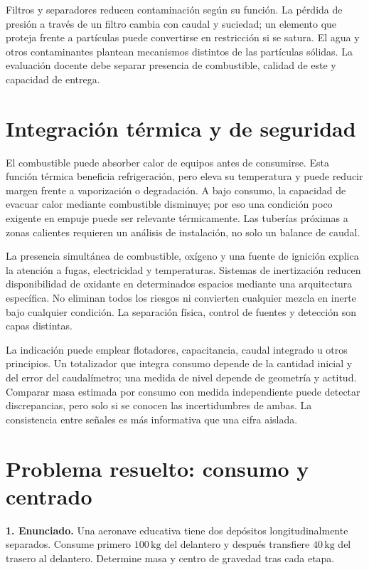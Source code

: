 Filtros y separadores reducen contaminación según su función. La pérdida de presión a través de un filtro cambia con caudal y suciedad; un elemento que proteja frente a partículas puede convertirse en restricción si se satura. El agua y otros contaminantes plantean mecanismos distintos de las partículas sólidas. La evaluación docente debe separar presencia de combustible, calidad de este y capacidad de entrega.

\section{Integración térmica y de seguridad}
El combustible puede absorber calor de equipos antes de consumirse. Esta función térmica beneficia refrigeración, pero eleva su temperatura y puede reducir margen frente a vaporización o degradación. A bajo consumo, la capacidad de evacuar calor mediante combustible disminuye; por eso una condición poco exigente en empuje puede ser relevante térmicamente. Las tuberías próximas a zonas calientes requieren un análisis de instalación, no solo un balance de caudal.

La presencia simultánea de combustible, oxígeno y una fuente de ignición explica la atención a fugas, electricidad y temperaturas. Sistemas de inertización reducen disponibilidad de oxidante en determinados espacios mediante una arquitectura específica. No eliminan todos los riesgos ni convierten cualquier mezcla en inerte bajo cualquier condición. La separación física, control de fuentes y detección son capas distintas.

La indicación puede emplear flotadores, capacitancia, caudal integrado u otros principios. Un totalizador que integra consumo depende de la cantidad inicial y del error del caudalímetro; una medida de nivel depende de geometría y actitud. Comparar masa estimada por consumo con medida independiente puede detectar discrepancias, pero solo si se conocen las incertidumbres de ambas. La consistencia entre señales es más informativa que una cifra aislada.

\section{Problema resuelto: consumo y centrado}
\textbf{1. Enunciado.} Una aeronave educativa tiene dos depósitos longitudinalmente separados. Consume primero $100\,\mathrm{kg}$ del delantero y después transfiere $40\,\mathrm{kg}$ del trasero al delantero. Determine masa y centro de gravedad tras cada etapa.

